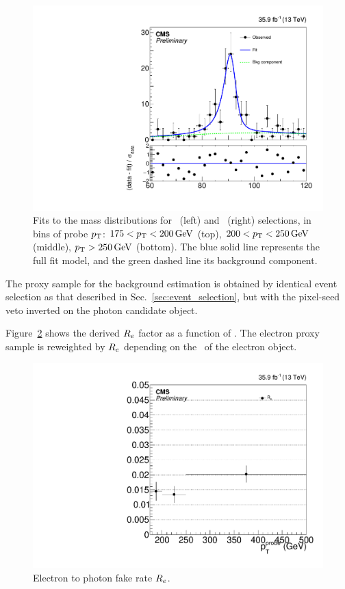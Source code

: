 \begin{figure}[htbp]
\begin{center}
    \includegraphics[width=0.48\linewidth]{Analysis/Figures/fit_data_eg_pt_250_6500.pdf}
    \caption{
      Fits to the mass distributions for \Pe\Pe\ (left) and \Pe\Pgg\ (right) selections, in bins of probe $p_{\mathrm{T}}$: $175 < p_{\mathrm{T}} < 200\,\text{Ge\hspace{-.08em}V}$ (top), $200 < p_{\mathrm{T}} < 250\,\text{Ge\hspace{-.08em}V}$ (middle), $p_{\mathrm{T}} > 250\,\text{Ge\hspace{-.08em}V}$ (bottom). 
      The blue solid line represents the full fit model, and the green dashed line its background component.
    }
    \label{fig:efake_fits}
  \end{center}
\end{figure}

The proxy sample for the background estimation is obtained by identical event selection as that described in Sec.~\ref{sec:event_selection}, but with the pixel-seed veto inverted on the photon candidate object.


Figure~\ref{fig:efake_frate} shows the derived $R_{{e}}$ factor as a function of \ETg. 
The electron proxy sample is reweighted by $R_{{e}}$ depending on the \pt\ of the electron object.

\begin{figure}[htbp]
  \begin{center}
    \includegraphics[width=0.48\linewidth]{Analysis/Figures/frate_data_ptalt.pdf} 
    \caption{
      Electron to photon fake rate $R_{{e}}$.
    }
    \label{fig:efake_frate}
  \end{center}
\end{figure}

